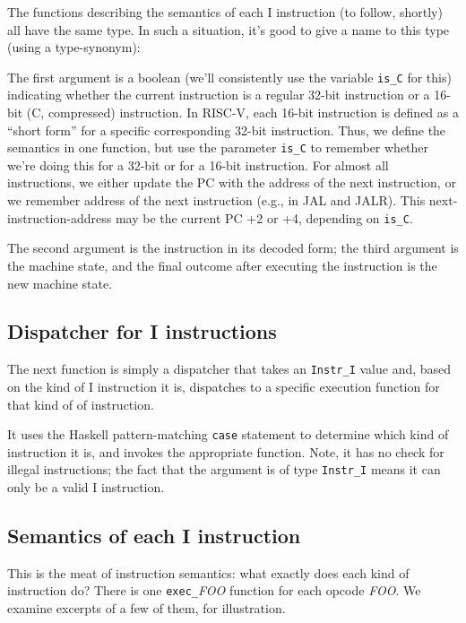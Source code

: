 \documentclass[11pt]{article}
\begin{document}
The functions describing the semantics of each I instruction (to
follow, shortly) all have the same type.  In such a situation, it's
good to give a name to this type (using a type-synonym):



The first argument is a boolean (we'll consistently use the variable
\verb|is_C| for this) indicating whether the current instruction is a
regular 32-bit instruction or a 16-bit (C, compressed) instruction.
In RISC-V, each 16-bit instruction is defined as a ``short form'' for
a specific corresponding 32-bit instruction.  Thus, we define the
semantics in one function, but use the parameter \verb|is_C| to
remember whether we're doing this for a 32-bit or for a 16-bit
instruction.  For almost all instructions, we either update the PC
with the address of the next instruction, or we remember address of
the next instruction (e.g., in JAL and JALR). This
next-instruction-address may be the current PC +2 or +4, depending on
\verb|is_C|.

The second argument is the instruction in its decoded form; the third
argument is the machine state, and the final outcome after executing
the instruction is the new machine state.


\subsection{Dispatcher for I instructions}

The next function is simply a dispatcher that takes an \verb|Instr_I|
value and, based on the kind of I instruction it is, dispatches to a
specific execution function for that kind of of instruction.



It uses the Haskell pattern-matching \verb|case| statement to
determine which kind of instruction it is, and invokes the appropriate
function.  Note, it has no check for illegal instructions; the fact
that the argument is of type \verb|Instr_I| means it can only be a
valid I instruction.


\subsection{Semantics of each I instruction}

This is the meat of instruction semantics: what exactly does each kind
of instruction do?  There is one \verb|exec_|\emph{FOO} function for
each opcode \emph{FOO}.  We examine excerpts of a few of them, for
illustration.
\end{document}
